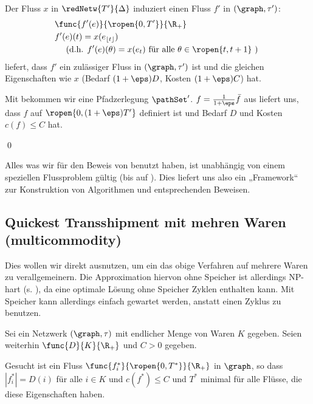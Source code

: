 \begin{standaloneProof}
    Der Fluss $x$ in $\redNetw{T'}{\Delta}$ induziert einen Fluss $f'$ in
    $(\graph, \tau')$:
    \begin{align*}
        & \func{f'(e)}{\ropen{0,T'}}{\R_+} \\
        & f'(e)(t) = x(e_{\lfloor t \rfloor}) \\
        & \quad \text{ (d.h. } f'(e)(\theta) = x(e_t)
            \text{ für alle } \theta \in \ropen{t, t+1} \text{ ) }
    \end{align*}
     liefert, dass $f'$ ein zulässiger Fluss in
    $(\graph, \tau')$ ist und die gleichen Eigenschaften wie $x$
    (Bedarf $(1+\eps)D$, Kosten $(1+\eps)C$) hat.
    
    Mit  bekommen wir eine Pfadzerlegung $\pathSet'$.
    $f = \frac{1}{1+\eps} \bar{f}$ aus  liefert uns, dass
    $f$ auf $\ropen{0, (1 + \eps)T'}$ definiert ist und Bedarf $D$ und Kosten
    $c(f) \leq C$ hat.
    \begin{flushright}\qed \end{flushright}
\end{standaloneProof}

\begin{remark}
    Alles was wir für den Beweis von  benutzt haben, ist
    unabhängig von einem speziellen Flussproblem gültig
    (bis auf ). Dies liefert uns also ein „Framework“
    zur Konstruktion von Algorithmen und entsprechenden Beweisen.
\end{remark}

\subsection{Quickest Transshipment mit mehren Waren (multicommodity)}
Dies wollen wir direkt ausnutzen, um ein das obige Verfahren auf mehrere
Waren zu verallgemeinern. Die Approximation hiervon ohne Speicher ist allerdings
NP-hart (s. \cite{fleischerSiam}), da eine optimale Lösung ohne Speicher
Zyklen enthalten kann. Mit Speicher kann allerdings einfach gewartet werden,
anstatt einen Zyklus zu benutzen.

\begin{problem}
\label{prob:qtp_multi}
    Sei ein Netzwerk $(\graph, \tau)$ mit endlicher Menge von Waren $K$ gegeben.
    Seien weiterhin $\func{D}{K}{\R_+}$ und $C > 0$ gegeben.

    Gesucht ist ein Fluss $\func{f_i^*}{\ropen{0,T^*}}{\R_+}$ in $\graph$,
    so dass $|f_i^*| = D(i)$ für alle $i \in K$ und
    $c(f^*) \leq C$ und $T^*$ minimal für alle Flüsse,
    die diese Eigenschaften haben.
\end{problem}


